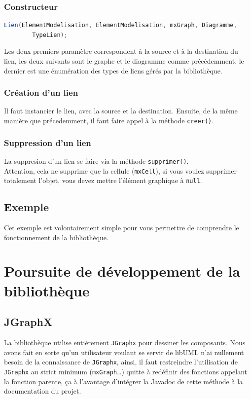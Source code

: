 \documentclass[12pt,a4paper,oneside]{book}
\begin{document}
	\subsection{Constructeur}
	\begin{lstlisting}[language=Java]
Lien(ElementModelisation, ElementModelisation, mxGraph, Diagramme, 
		TypeLien);
	\end{lstlisting}
	Les deux premiers paramètre correspondent à la source et à la destination du lien, les deux suivants sont le graphe et le diagramme comme précédemment, le 
	dernier est une énumération des types de liens gérés par la bibliothèque.
	\subsection{Création d'un lien}
	Il faut instancier le lien, avec la source et la destination. Ensuite, de la même manière que précedemment, il faut faire appel à la méthode \texttt{creer()}.
	\subsection{Suppression d'un lien}
	La suppresion d'un lien se faire via la méthode \texttt{supprimer()}. \\
	Attention, cela ne supprime que la cellule (\texttt{mxCell}), si vous voulez supprimer totalement l'objet, vous devez mettre l'élément graphique à \texttt{null}.


	\section{Exemple}
	
	Cet exemple est volontairement simple pour vous permettre de comprendre le fonctionnement de la bibliothèque.
	\chapter{Poursuite de développement de la bibliothèque}				
	\nouveauChapitre
	\section{JGraphX}
	La bibliothèque utilise entièrement \texttt{JGraphx} pour dessiner les composants. Nous avons fait en sorte qu'un utilisateur voulant se servir de libUML
	n'ai nullement besoin de la connaissance de \texttt{JGraphx}, ainsi, il faut restreindre l'utilisation de \texttt{JGraphx} au strict minimum (\texttt{mxGraph}\ldots) quitte
	à redéfinir des fonctions appelant la fonction parente, ça à l'avantage d'intégrer la Javadoc de cette méthode à la documentation du projet.
\end{document}
